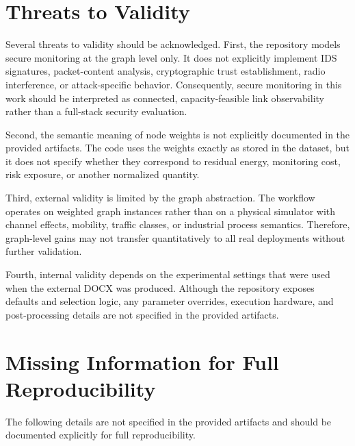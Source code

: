 \documentclass[11pt]{article}
\begin{document}
\section{Threats to Validity}

Several threats to validity should be acknowledged. First, the repository models secure monitoring at the graph level only. It does not explicitly implement IDS signatures, packet-content analysis, cryptographic trust establishment, radio interference, or attack-specific behavior. Consequently, secure monitoring in this work should be interpreted as connected, capacity-feasible link observability rather than a full-stack security evaluation.

Second, the semantic meaning of node weights is not explicitly documented in the provided artifacts. The code uses the weights exactly as stored in the dataset, but it does not specify whether they correspond to residual energy, monitoring cost, risk exposure, or another normalized quantity.

Third, external validity is limited by the graph abstraction. The workflow operates on weighted graph instances rather than on a physical simulator with channel effects, mobility, traffic classes, or industrial process semantics. Therefore, graph-level gains may not transfer quantitatively to all real deployments without further validation.

Fourth, internal validity depends on the experimental settings that were used when the external DOCX was produced. Although the repository exposes defaults and selection logic, any parameter overrides, execution hardware, and post-processing details are not specified in the provided artifacts.

\section{Missing Information for Full Reproducibility}

The following details are not specified in the provided artifacts and should be documented explicitly for full reproducibility.
\end{document}
